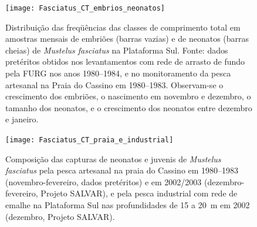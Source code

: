 \documentclass[a4paper,11pt,twoside,showtrims,onecolumn,openright,final]{memoir}
\begin{document}

%
%

\begin{figure}
\begin{center}
\texttt{[image: Fasciatus\_CT\_embrios\_neonatos]}
\end{center}
\caption[Distribuição das freqüências das classes de comprimento total em amostras mensais 
         de embriões e de neonatos de \emph{Mustelus fasciatus} na Plataforma Sul.]
        {Distribuição das freqüências das classes de comprimento total em amostras mensais 
         de embriões (barras vazias) e de neonatos (barras cheias) de \emph{Mustelus fasciatus} na Plataforma Sul. 
         Fonte: dados pretéritos obtidos nos levantamentos com rede de arrasto de fundo pela FURG nos 
         anos 1980--1984, e no monitoramento da pesca artesanal na Praia do Cassino em 1980--1983. 
         Observam-se o crescimento dos embriões, o nascimento em novembro e dezembro, o tamanho dos neonatos, 
         e o crescimento dos neonatos entre dezembro e janeiro.}
\label{fig:fasciatus-ct-neonatos-embrioes}
\end{figure}


%
%

\begin{figure}
\begin{center}
\texttt{[image: Fasciatus\_CT\_praia\_e\_industrial]}
\end{center}
\caption[Composição das capturas de neonatos e juvenis de \emph{Mustelus fasciatus} pela pesca artesanal
         na praia do Cassino e pela pesca industrial com rede de emalhe na Plataforma Sul]
        {Composição das capturas de neonatos e juvenis de \emph{Mustelus fasciatus} pela pesca artesanal 
         na praia do Cassino em  1980--1983 (novembro-fevereiro, dados pretéritos)  e em 2002/2003 
         (dezembro-fevereiro, Projeto SALVAR), e pela pesca industrial com rede de emalhe na Plataforma Sul 
         nas profundidades de 15 a 20~m em 2002 (dezembro, Projeto SALVAR).}
\label{fig:fasciatus-ct-praia-e-industrial}
\end{figure}


%
%
\end{document}
